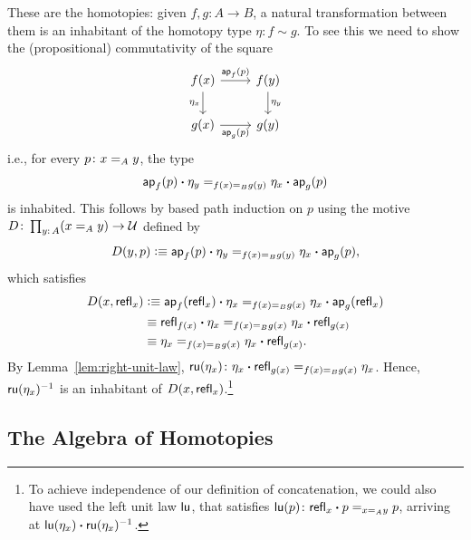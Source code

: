 \begin{description}[font=\normalfont\scshape]
    \item[Natural transformations.]\label{nat-transformation} These are the homotopies: given $f,g\colon A\to B$, a natural transformation between them is an inhabitant of the homotopy type $\eta\colon f\sim g$. To see this we need to show the (propositional) commutativity of the square
    \begin{equation}\label{tik:nat-transformation}
        \begin{tikzcd}
            f(x)
                    \arrow[r,"\fun{ap}_f(p)"]
                    \arrow[d,"\eta_x"']
                &f(y)
                    \arrow[d,"\eta_y"]\\
            g(x)
                    \arrow[r,"\fun{ap}_g(p)"']
                &g(y)
        \end{tikzcd}
    \end{equation}
    i.e., for every $p\colon x\eq Ay$, the type
    \begin{equation}\label{eq:nat-transformation}
        \mathsf{ap}_f(p)\mathbin{\boldsymbol{\cdot}}\eta_y\mathrel{=_{f(x)\mathrel{=_{B}}g(y)}}\eta_x\mathbin{\boldsymbol{\cdot}}\mathsf{ap}_g(p)
    \end{equation}
    is inhabited. This follows by based path induction on $p$ using the motive $D\colon\prod_{y\colon A}(x\eq Ay)\to\univ$ defined by
    \[
        D(y,p)\mathrel{\vcentcolon}\equiv
            \mathsf{ap}_f(p)\mathbin{\boldsymbol{\cdot}}\eta_y\mathrel{=_{f(x)\mathrel{=_{B}}g(y)}}\eta_x\mathbin{\boldsymbol{\cdot}}\mathsf{ap}_g(p),
    \]
    which satisfies
    \begin{align*}
        D(x,\mathsf{refl}_x)
            &\mathrel{\vcentcolon}\equiv\mathsf{ap}_f(\mathsf{refl}_x)\mathbin{\boldsymbol{\cdot}}\eta_x
                \mathrel{=_{f(x)\mathrel{=_{B}}g(x)}}\eta_x\mathbin{\boldsymbol{\cdot}}\mathsf{ap}_g(\mathsf{refl}_x)\\
            &\equiv\mathsf{refl}_{f(x)}\mathbin{\boldsymbol{\cdot}}\eta_x
                \mathrel{=_{f(x)\mathrel{=_{B}}g(x)}}\eta_x\mathbin{\boldsymbol{\cdot}}\mathsf{refl}_{g(x)}\\
            &\equiv\eta_x\mathrel{=_{f(x)\mathrel{=_{B}}g(x)}}\eta_x\mathbin{\boldsymbol{\cdot}}\mathsf{refl}_{g(x)}.
    \end{align*}
    By Lemma~\ref{lem:right-unit-law}, $\fun{ru}(\eta_x)\colon\eta_x\ct\fun{refl}_{g(x)}\eq{f(x)\eq Bg(x)}\eta_x$. Hence, $\mathsf{ru}(\eta_x)^{-1}$ is an inhabitant of $D(x,\mathsf{refl}_x)$.\footnote{To achieve independence of our definition of concatenation, we could also have used the left unit law $\mathsf{lu}$, that satisfies $\fun{lu}(p)\colon\fun{refl}_x\ct p\eq{x\eq Ay}p$, arriving at $\mathsf{lu}(\eta_x)\mathbin{\boldsymbol{\cdot}}\mathsf{ru}(\eta_x)^{-1}$.}
\end{description}

\subsection{The Algebra of Homotopies}


